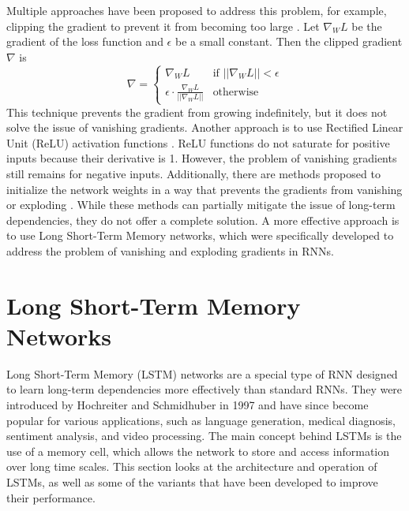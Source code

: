 \documentclass{article}
\begin{document}
Multiple approaches have been proposed to address this problem, for example, clipping the
gradient to prevent it from becoming too large
\cite{pascanuDifficultyTrainingRecurrent2013}. Let $\nabla_W L$ be the gradient of the
loss function and $\epsilon$ be a small constant. Then the clipped gradient $\nabla$ is
\begin{equation}
  \nabla =
  \begin{cases}
    \nabla_W L                                       & \text{if } ||\nabla_W L|| < \epsilon \\
    \epsilon \cdot \frac{\nabla_W L}{||\nabla_W L||} & \text{otherwise}
  \end{cases}
\end{equation}
This technique prevents the gradient from growing indefinitely, but it does not solve the
issue of vanishing gradients. Another approach is to use Rectified Linear Unit (ReLU)
activation functions \cite{glorotDeepSparseRectifier2010}. ReLU functions do not saturate
for positive inputs because their derivative is 1. However, the problem of vanishing
gradients still remains for negative inputs. Additionally, there are methods proposed to
initialize the network weights in a way that prevents the gradients from vanishing or
exploding \cite{kumar2017weight}. While these methods can partially mitigate the issue of
long-term dependencies, they do not offer a complete solution. A more effective approach
is to use Long Short-Term Memory networks, which were specifically developed to address
the problem of vanishing and exploding gradients in RNNs.



\section{Long Short-Term Memory Networks}
\label{ch:3}

Long Short-Term Memory (LSTM) networks are a special type of RNN designed to learn
long-term dependencies more effectively than standard RNNs. They were introduced by
Hochreiter and Schmidhuber in 1997 \cite{hochreiterLongShorttermMemory1997} and have since
become popular for various applications, such as language generation, medical diagnosis,
sentiment analysis, and video processing. The main concept behind LSTMs is the use of a
memory cell, which allows the network to store and access information over long time
scales. This section looks at the architecture and operation of LSTMs, as well as some of
the variants that have been developed to improve their performance.
\end{document}
